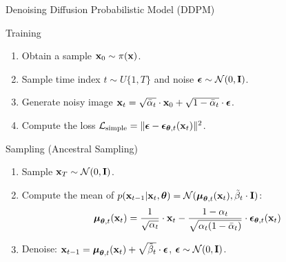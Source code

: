 \documentclass{beamer}
\begin{document}
\begin{frame}{Denoising Diffusion Probabilistic Model (DDPM)}
    \begin{block}{Training}
        \begin{enumerate}
            \item Obtain a sample $\mathbf{x}_0 \sim \pi(\mathbf{x})$.
            \item Sample time index $t \sim U\{1, T\}$ and noise $\boldsymbol{\epsilon} \sim \mathcal{N}(0, \mathbf{I})$.
            \item Generate noisy image $\mathbf{x}_t = \sqrt{\bar{\alpha}_t} \cdot \mathbf{x}_0 + \sqrt{1 - \bar{\alpha}_t} \cdot \boldsymbol{\epsilon}$.
            \item Compute the loss $ \mathcal{L}_{\text{simple}} = \| \boldsymbol{\epsilon} - \boldsymbol{\epsilon}_{\boldsymbol{\theta}, t}(\mathbf{x}_t) \|^2 $.
        \end{enumerate}
    \end{block}
    \begin{block}{Sampling (Ancestral Sampling)}
        \begin{enumerate}
            \item Sample $\mathbf{x}_T \sim \mathcal{N}(0, \mathbf{I})$.
            \item Compute the mean of $p(\mathbf{x}_{t-1} | \mathbf{x}_t, \boldsymbol{\theta}) = \mathcal{N}(\boldsymbol{\mu}_{\boldsymbol{\theta}, t}(\mathbf{x}_t), \tilde{\beta}_t \cdot \mathbf{I})$:
            \[
                \boldsymbol{\mu}_{\boldsymbol{\theta}, t}(\mathbf{x}_t) = \frac{1}{\sqrt{\alpha_t}} \cdot \mathbf{x}_t - \frac{1 - \alpha_t}{\sqrt{\alpha_t (1 - \bar{\alpha}_t)}} \cdot \boldsymbol{\epsilon}_{\boldsymbol{\theta}, t}(\mathbf{x}_t)
            \]
            \vspace{-0.3cm}
            \item Denoise: $\mathbf{x}_{t - 1} = \boldsymbol{\mu}_{\boldsymbol{\theta}, t}(\mathbf{x}_t) +  \sqrt{\tilde{\beta}_t} \cdot \boldsymbol{\epsilon}$, $\boldsymbol{\epsilon} \sim \mathcal{N}(0, \mathbf{I})$.
        \end{enumerate}
    \end{block}
\end{frame}
\end{document}
